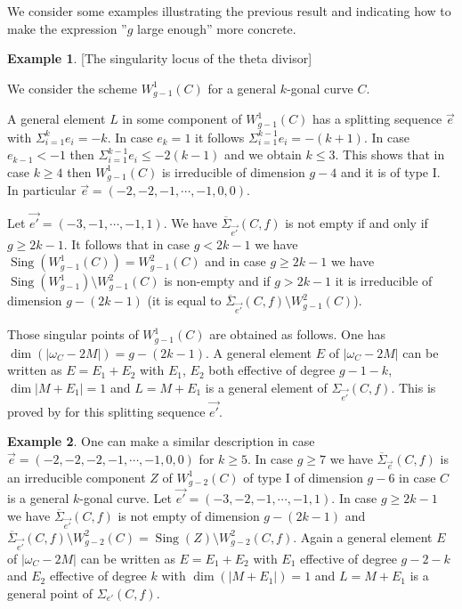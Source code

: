 \documentclass{article}
\DeclareMathOperator{\Sing}{Sing}
\theoremstyle{definition}
\newtheorem{example}{Example}
\theoremstyle{remark}
\begin{document}
We consider some examples illustrating the previous result and indicating how to make the expression ''$g$ large enough'' more concrete.

\begin{example}\label{ex1}[The singularity locus of the theta divisor]

We consider the scheme $W^1_{g-1}(C)$ for a general $k$-gonal curve $C$.

A general element $L$ in some component of $W^1_{g-1}(C)$ has a splitting sequence $\overrightarrow {e}$ with $\Sigma _{i=1}^k e_i=-k$.
In case $e_k=1$ it follows $\Sigma _{i=1}^{k-1} e_i=-(k+1)$.
In case $e_{k-1}<-1$ then $\Sigma _{i=1}^{k-1} e_i\leq -2(k-1)$ and we obtain $k\leq 3$.
This shows that in case $k\geq 4$ then $W^1_{g-1}(C)$ is irreducible of dimension $g-4$ and it is of type I.
In particular $\overrightarrow {e}= (-2,-2,-1, \cdots ,-1,0,0)$.

Let $\overrightarrow{e'}=(-3,-1,\cdots ,-1,1)$.
We have $\overline {\Sigma}_{\overrightarrow {e'}}(C,f)$ is not empty if and only if $g \geq 2k-1$.
It follows that in case $g<2k-1$ we have $\Sing (W^1_{g-1}(C))=W^2_{g-1}(C)$ and in case $g \geq 2k-1$ we have $\Sing (W^1_{g-1})\setminus W^2_{g-1}(C)$ is non-empty and if $g>2k-1$ it is irreducible of dimension $g-(2k-1)$ (it is equal to $\overline {\Sigma}_{\overrightarrow{e'}}(C,f) \setminus W^2_{g-1}(C)$).

Those singular points of $W^1_{g-1}(C)$ are obtained as follows.
One has $\dim (\vert \omega _C-2M \vert)=g-(2k-1)$.
A general element $E$ of $\vert \omega _C -2M \vert$ can be written as $E=E_1+E_2$ with $E_1$, $E_2$ both effective of degree $g-1-k$, $\dim \vert M+E_1 \vert =1$ and $L=M+E_1$ is a general element of $\Sigma _{\overrightarrow {e'}}(C,f)$.
This is proved by \cite{ref7} for this splitting sequence $\overrightarrow {e'}$.
\end{example}

\begin{example}\label{ex2}
One can make a similar description in case $\overrightarrow {e}=(-2,-2,-2,-1,\cdots ,-1,0,0)$ for $k \geq 5$.
In case $g \geq 7$ we have $\overline {\Sigma}_{\overrightarrow {e}}(C,f)$ is an irreducible component $Z$ of $W^1_{g-2}(C)$ of type I of dimension $g-6$ in case $C$ is a general $k$-gonal curve.
Let $\overrightarrow {e'}=(-3,-2,-1, \cdots, -1,1)$.
In case $g \geq 2k-1$ we have $\overline {\Sigma}_{\overrightarrow {e'}}(C,f)$ is not empty of dimension $g-(2k-1)$ and $\overline {\Sigma}_{\overrightarrow {e'}}(C,f) \setminus W^2_{g-2}(C)=\Sing (Z)\setminus W^2_{g-2}(C,f)$.
Again a general element $E$ of $\vert \omega _C-2M \vert$ can be written as $E=E_1+E_2$ with $E_1$ effective of degree $g-2-k$ and $E_2$ effective of degree $k$ with $\dim (\vert M+E_1 \vert )=1$ and $L=M+E_1$ is a general point of $\Sigma _{e'}(C,f)$.
\end{example}
\end{document}
